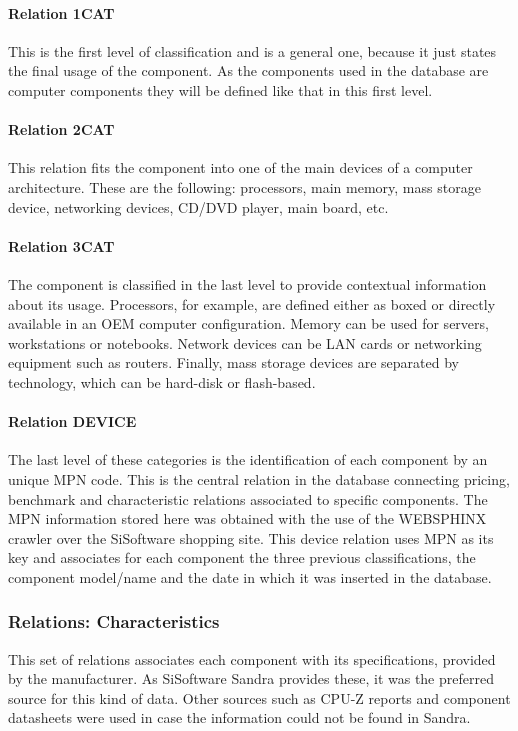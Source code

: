         \paragraph*{Relation 1CAT}
            This is the first level of classification and is a general one, because it just states the final usage of the component. As the components used in the database are computer components they will be defined like that in this first level.

        \paragraph*{Relation 2CAT}
            This relation fits the component into one of the main devices of a computer architecture. These are the following: processors, main memory, mass storage device, networking devices, CD/DVD player, main board, etc.

        \paragraph*{Relation 3CAT}
            The component is classified in the last level to provide contextual information about its usage. Processors, for example, are defined either as boxed or directly available in an OEM computer configuration. Memory can be used for servers, workstations or notebooks. Network devices can be LAN cards or networking equipment such as routers. Finally, mass storage devices are separated by technology, which can be hard-disk or flash-based.

        \paragraph*{Relation DEVICE}
            The last level of these categories is the identification of each component by an unique MPN code. This is the central relation in the database connecting pricing, benchmark and characteristic relations associated to specific components. The MPN information stored here was obtained with the use of the WEBSPHINX crawler over the SiSoftware shopping site. This device relation uses MPN as its key and associates for each component the three previous classifications, the component model/name and the date in which it was inserted in the database.
            
    \subsubsection*{Relations: Characteristics}
        This set of relations associates each component with its specifications, provided by the manufacturer. As SiSoftware Sandra provides these, it was the preferred source for this kind of data. Other sources such as CPU-Z reports and component datasheets were used in case the information could not be found in Sandra.         

